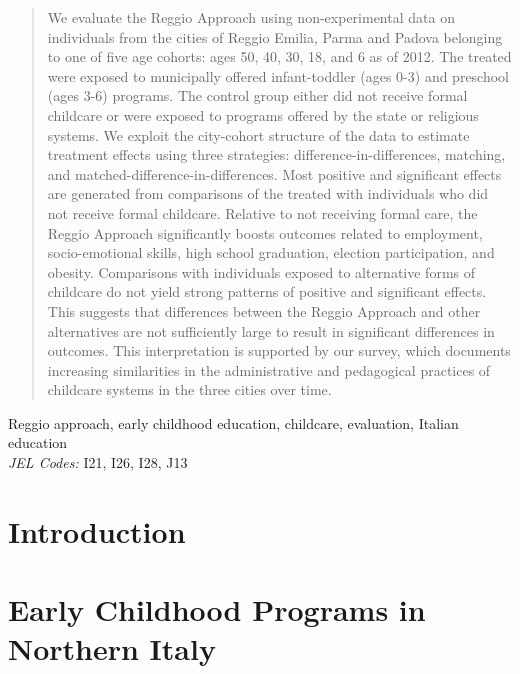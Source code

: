 \documentclass[review]{elsarticle}
\begin{document}
\begin{frontmatter}
\begin{abstract}
We evaluate the Reggio Approach using non-experimental data on individuals from the cities of Reggio Emilia, Parma and Padova belonging to one of five age cohorts: ages 50, 40, 30, 18, and 6 as of 2012. The treated were exposed to municipally offered infant-toddler (ages 0-3) and preschool (ages 3-6) programs. The control group either did not receive formal childcare or were exposed to programs offered by the state or religious systems. We exploit the city-cohort structure of the data to estimate treatment effects using three strategies: difference-in-differences, matching, and matched-difference-in-differences. Most positive and significant effects are generated from comparisons of the treated with individuals who did not receive formal childcare. Relative to not receiving formal care, the Reggio Approach significantly boosts outcomes related to employment, socio-emotional skills, high school graduation, election participation, and obesity. Comparisons with individuals exposed to alternative forms of childcare do not yield strong patterns of positive and significant effects. This suggests that differences between the Reggio Approach and other alternatives are not sufficiently large to result in significant differences in outcomes. This interpretation is supported by our survey, which documents increasing similarities in the administrative and pedagogical practices of childcare systems in the three cities over time.
\end{abstract}

\begin{keyword}
Reggio approach, early childhood education, childcare, evaluation, Italian education\\
\emph{JEL Codes:} I21, I26,  I28, J13
\end{keyword}

\end{frontmatter}

\linenumbers

\section{Introduction}\label{sec:introduction}


\section{Early Childhood Programs in Northern Italy}\label{sec:ece-italy}

\end{document}
